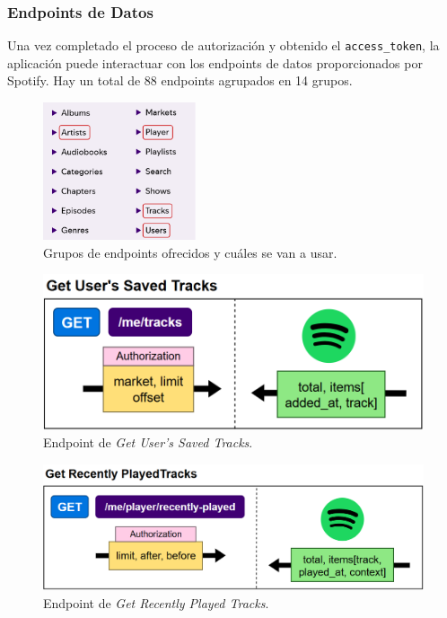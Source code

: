 \subsubsection{Endpoints de Datos}

Una vez completado el proceso de autorización y obtenido el \texttt{access\_token}, la aplicación puede interactuar con los endpoints de datos proporcionados por Spotify. Hay un total de 88 endpoints agrupados en 14 grupos.

\begin{figure}[H]
    \centering
    \includegraphics[width=0.4\textwidth]{figures/selected_groups.png}
    \caption{Grupos de endpoints ofrecidos y cuáles se van a usar.}
    \label{fig:selected_groups}
\end{figure}


\begin{figure}[H]
    \centering
    \includegraphics[width=\textwidth]{figures/endpoints/get_users_saved_tracks.png}
    \caption{Endpoint de \textit{Get User's Saved Tracks}.}
    \label{fig:get_usr_saved_tracks}
\end{figure}

\begin{figure}[H]
    \centering
    \includegraphics[width=\textwidth]{figures/endpoints/get_recently_played_tracks.png}
    \caption{Endpoint de \textit{Get Recently Played Tracks}.}
    \label{fig:get_recently_played_tracks}
\end{figure}

